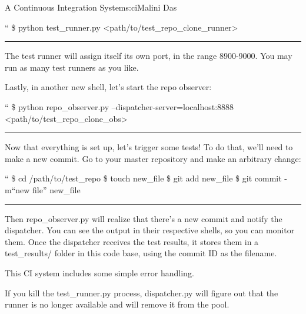 \begin{aosachapter}{A Continuous Integration System}{s:ci}{Malini Das}
\begin{aosadescription}

\item[``]
\$ python test\_runner.py
\textless{}path/to/test\_repo\_clone\_runner\textgreater{}
\end{aosadescription}

\begin{center}\rule{3in}{0.4pt}\end{center}

The test runner will assign itself its own port, in the range 8900-9000.
You may run as many test runners as you like.

Lastly, in another new shell, let's start the repo observer:

\begin{aosadescription}

\item[``]
\$ python repo\_observer.py --dispatcher-server=localhost:8888
\textless{}path/to/test\_repo\_clone\_obs\textgreater{}
\end{aosadescription}

\begin{center}\rule{3in}{0.4pt}\end{center}

Now that everything is set up, let's trigger some tests! To do that,
we'll need to make a new commit. Go to your master repository and make
an arbitrary change:

\begin{aosadescription}

\item[``]
\$ cd /path/to/test\_repo \$ touch new\_file \$ git add new\_file \$ git
commit -m``new file'' new\_file
\end{aosadescription}

\begin{center}\rule{3in}{0.4pt}\end{center}

Then repo\_observer.py will realize that there's a new commit and notify
the dispatcher. You can see the output in their respective shells, so
you can monitor them. Once the dispatcher receives the test results, it
stores them in a test\_results/ folder in this code base, using the
commit ID as the filename.

\label{error-handling}

This CI system includes some simple error handling.

If you kill the test\_runner.py process, dispatcher.py will figure out
that the runner is no longer available and will remove it from the pool.


\end{aosachapter}
